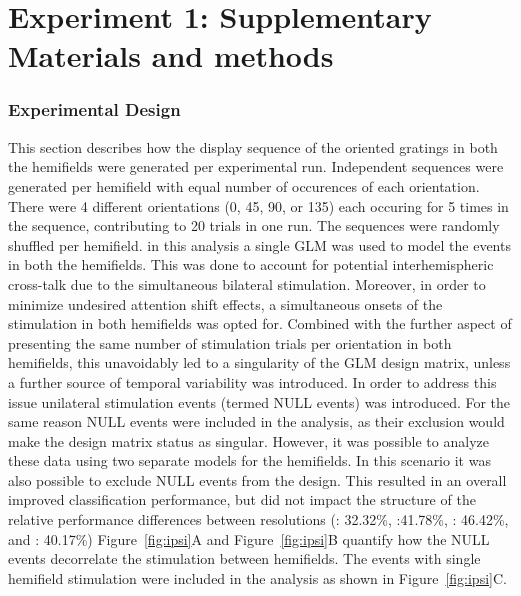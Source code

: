 \chapter{Experiment 1: Supplementary Materials and methods}

\subsection*{Experimental Design}
\label{sec:supp_Experimental_Design}

\noindent This section describes how the display sequence of the 
oriented gratings in both the hemifields were generated per experimental run.
Independent sequences were generated per hemifield with equal number of occurences of
each orientation. There were 4 different orientations (0\textdegree,
45\textdegree, 90\textdegree, or 135\textdegree) each occuring for 
5 times in the sequence, contributing to 20 trials in one run.
The sequences were randomly shuffled per hemifield. in this analysis a 
single GLM was used to model the events in both the hemifields. This was done 
to account for potential interhemispheric cross-talk due to the 
simultaneous bilateral stimulation. Moreover, in order to minimize 
undesired attention shift effects, a simultaneous onsets of the stimulation 
in both hemifields was opted for. Combined with the further aspect of 
presenting the same number of stimulation trials per orientation in both hemifields, 
this unavoidably led to a singularity of the GLM design matrix, 
unless a further source of temporal variability was introduced.
In order to address this issue unilateral stimulation events (termed NULL events) 
was introduced. For the same reason NULL events were included in the analysis, 
as their exclusion would make the design matrix status as singular. However, 
it was possible to analyze these data using two separate models for the hemifields. 
In this scenario it was also possible to exclude NULL events from the design. 
This resulted in an overall improved classification performance, but did 
not impact the structure of the relative performance differences 
between resolutions (: 32.32\%, :41.78\%, : 46.42\%, and : 40.17\%)
Figure~\ref{fig:ipsi}A and Figure~\ref{fig:ipsi}B quantify how the NULL events decorrelate the 
stimulation between hemifields. The events with single hemifield stimulation 
were included in the analysis as shown in Figure~\ref{fig:ipsi}C. 






